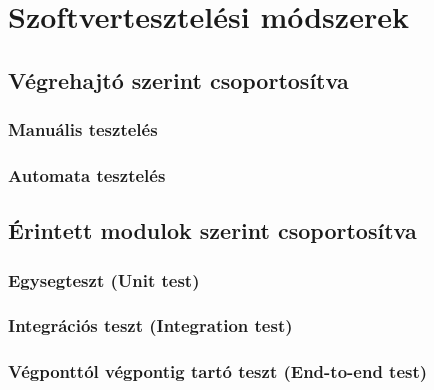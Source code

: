 \section{Szoftvertesztelési módszerek}
\subsection{Végrehajtó szerint csoportosítva}
\subsubsection{Manuális tesztelés}
\subsubsection{Automata tesztelés}
\subsection{Érintett modulok szerint csoportosítva}
\subsubsection{Egysegteszt (Unit test)}
\subsubsection{Integrációs teszt (Integration test)}
\subsubsection{Végponttól végpontig tartó teszt (End-to-end test)}